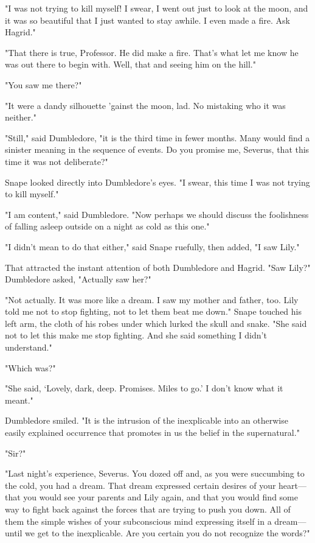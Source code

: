 "I was not trying to kill myself! I swear, I went out just to look at the moon, and it was so{\el} beautiful{\el} that I just wanted to stay awhile. I even made a fire. Ask Hagrid."

"That there is true, Professor. He did make a fire. That's what let me know he was out there to begin with. Well, that and seeing him on the hill."

"You saw me there?"

"It were a dandy silhouette 'gainst the moon, lad. No mistaking who it was neither."

"Still," said Dumbledore, "it is the third time in fewer months. Many would find a sinister meaning in the sequence of events. Do you promise me, Severus, that this time it was not deliberate?"

Snape looked directly into Dumbledore's eyes. "I swear, this time I was not trying to kill myself."

"I am content," said Dumbledore. "Now perhaps we should discuss the foolishness of falling asleep outside on a night as cold as this one."

"I didn't mean to do that either," said Snape ruefully, then added, "I saw Lily."

That attracted the instant attention of both Dumbledore and Hagrid. "Saw Lily?" Dumbledore asked, "Actually saw her?"

"Not actually. It was more like a dream. I saw my mother and father, too. Lily told me not to stop fighting, not to let them beat me down." Snape touched his left arm, the cloth of his robes under which lurked the skull and snake. "She said not to let this make me stop fighting. And she said something I didn't understand."

"Which was?"

"She said, `Lovely, dark, deep. Promises. Miles to go.' I don't know what it meant."

Dumbledore smiled. "It is the intrusion of the inexplicable into an otherwise easily explained occurrence that promotes in us the belief in the supernatural."

"Sir?"

"Last night's experience, Severus. You dozed off and, as you were succumbing to the cold, you had a dream. That dream expressed certain desires of your heart—that you would see your parents and Lily again, and that you would find some way to fight back against the forces that are trying to push you down. All of them the simple wishes of your subconscious mind expressing itself in a dream—until we get to the inexplicable. Are you certain you do not recognize the words?"

